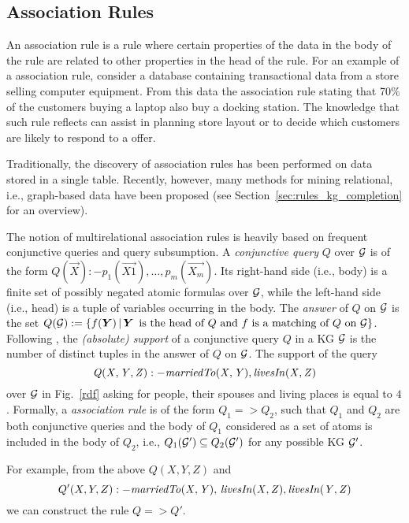 \subsection{Association Rules}
An association rule is a rule where certain properties of the data in the body of
the rule are related to other properties in the head of the rule. For an example of a association rule, consider a
database containing transactional data from a store selling computer equipment.
From this data the association rule stating that 70\% of the customers
buying a laptop also buy a docking station. The knowledge that such rule reflects 
can assist in planning store layout or to decide which customers are likely to respond to a
offer.

Traditionally, the discovery of association rules  has been performed on data stored in a single table.
Recently, however, many methods for mining relational, i.e., graph-based data have been
proposed (see Section~\ref{sec:rules_kg_completion} for an overview). 

The notion of multirelational association rules is heavily based on frequent conjunctive queries and query subsumption. 
A \emph{conjunctive query} $Q$ over $\mathcal{G}$ is of the form $Q(\vec{X}):-p_1(\vec{X1}),\dotsc,p_m(\vec{X_m})$. Its  right-hand side (i.e., body) is a finite set of possibly negated atomic formulas over $\mathcal{G}$, while the left-hand side (i.e., head) is a tuple of variables occurring in the body. The \emph{answer} of $Q$ on $\mathcal{G}$ is the set $Q(\cG):=\{f(\vec{Y})\,|\,\vec{Y}\,\text{  is the head of } Q \text{ and } f \text{ is a matching of }\\ Q \text{ on } \cG\}$.
Following \cite{DBLP:conf/ilp/DehaspeR97}, the \emph{(absolute) support} of a conjunctive query $Q$ in a KG $\mathcal{G}$ is the number of distinct tuples in the answer of $Q$ on $\mathcal{G}$. The support of the query
\begin{equation}\mathit{Q(X,Y,Z):-marriedTo(X,Y),\, }\mathit{livesIn(X,Z)}
\end{equation}
over $\mathcal{G}$ in Fig.~\ref{rdf} asking for people, their spouses and living places is equal to $4$. 
Formally, a \emph{association rule} is of the form $Q_1 => Q_2$, such that $Q_1$ and $Q_2$ are both conjunctive queries and the body of $Q_1$ considered as a set of atoms is included in the body of $Q_2$,  i.e., $Q_1(\mathcal{G}')\subseteq Q_2(\mathcal{G}')$ for any possible KG $\mathcal{G}'$. 

For example, from the above $Q(X,Y,Z)$ and
\begin{equation}Q'(X,Y,Z):-\mathit{marriedTo(X,Y),\,livesIn(X,Z),\,} \mathit{livesIn(Y,Z)}
\end{equation} we can construct the rule $Q => Q'$. 
 

